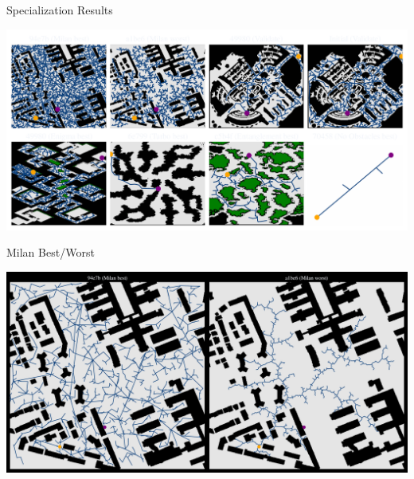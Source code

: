 \documentclass[aspectratio=169]{beamer}
\begin{document}
\begin{frame}{Specialization Results}
    
    
    \includegraphics[width=1.0\linewidth, keepaspectratio]{figures/learned.pdf}
\end{frame}

\begin{frame}{Milan Best/Worst}
    
    \includegraphics[width=1.0\linewidth, keepaspectratio]{figures/learned_split_0.pdf}
\end{frame}
\end{document}
